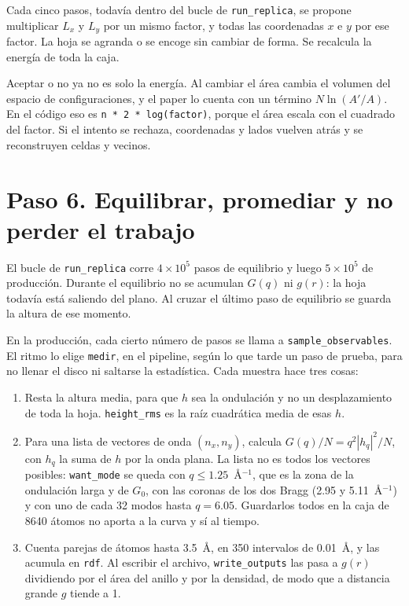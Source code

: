\documentclass[11pt,a4paper]{article}
\newcommand{\fn}[1]{\texttt{#1}}
\begin{document}
Cada cinco pasos, todavía dentro del bucle de \fn{run\_replica}, se propone multiplicar $L_x$ y $L_y$ por un mismo factor, y todas las coordenadas $x$ e $y$ por ese factor. La hoja se agranda o se encoge sin cambiar de forma. Se recalcula la energía de toda la caja.

Aceptar o no ya no es solo la energía. Al cambiar el área cambia el volumen del espacio de configuraciones, y el paper lo cuenta con un término $N\ln(A'/A)$. En el código eso es \fn{n * 2 * log(factor)}, porque el área escala con el cuadrado del factor. Si el intento se rechaza, coordenadas y lados vuelven atrás y se reconstruyen celdas y vecinos.

\section{Paso 6. Equilibrar, promediar y no perder el trabajo}

El bucle de \fn{run\_replica} corre $4\times 10^5$ pasos de equilibrio y luego $5\times 10^5$ de producción. Durante el equilibrio no se acumulan $G(q)$ ni $g(r)$: la hoja todavía está saliendo del plano. Al cruzar el último paso de equilibrio se guarda la altura de ese momento.

En la producción, cada cierto número de pasos se llama a \fn{sample\_observables}. El ritmo lo elige \fn{medir}, en el pipeline, según lo que tarde un paso de prueba, para no llenar el disco ni saltarse la estadística. Cada muestra hace tres cosas:

\begin{enumerate}
\item Resta la altura media, para que $h$ sea la ondulación y no un desplazamiento de toda la hoja. \fn{height\_rms} es la raíz cuadrática media de esas $h$.
\item Para una lista de vectores de onda $(n_x, n_y)$, calcula $G(q)/N = q^2|h_q|^2/N$, con $h_q$ la suma de $h$ por la onda plana. La lista no es todos los vectores posibles: \fn{want\_mode} se queda con $q\le 1.25$~Å$^{-1}$, que es la zona de la ondulación larga y de $G_0$, con las coronas de los dos Bragg (2.95 y 5.11~Å$^{-1}$) y con uno de cada 32 modos hasta $q=6.05$. Guardarlos todos en la caja de 8640 átomos no aporta a la curva y sí al tiempo.
\item Cuenta parejas de átomos hasta 3.5~Å, en 350 intervalos de 0.01~Å, y las acumula en \fn{rdf}. Al escribir el archivo, \fn{write\_outputs} las pasa a $g(r)$ dividiendo por el área del anillo y por la densidad, de modo que a distancia grande $g$ tiende a 1.
\end{enumerate}
\end{document}
